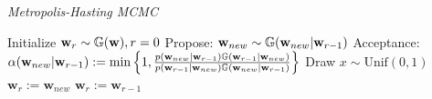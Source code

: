 \begin{algorithm}[!t]
\caption{\it Metropolis-Hasting MCMC}
\label{algo:mcmcmh}
\begin{algorithmic}[1]\vspace{.2cm}
\item Initialize $\mathbf{w}_{r}\sim\mathbb{G}(\mathbf{w}),r=0$\vspace{.2cm}
\vspace{.2cm}
\State Propose: $\mathbf{w}_{new}\sim\mathbb{G}(\mathbf{w}_{new}|\mathbf{w}_{r-1})$\vspace{.2cm}
\State Acceptance: $\alpha(\mathbf{w}_{new}|\mathbf{w}_{r-1}):=\min\left\{1,\frac{ p(\mathbf{w}_{new}|\mathbf{w}_{r-1})\mathbb{G}(\mathbf{w}_{r-1}|\mathbf{w}_{new})}{ p(\mathbf{w}_{r-1}|\mathbf{w}_{new})\mathbb{G}(\mathbf{w}_{new}|\mathbf{w}_{r-1})}\right\}$\vspace{.2cm}
\State Draw $x\sim\text{Unif}(0,1)$\vspace{.2cm}
\vspace{.2cm}
\State $\mathbf{w}_{r}:=\mathbf{w}_{new}$
\vspace{.2cm}
\Else \vspace{.2cm}
\State $\mathbf{w}_{r}:=\mathbf{w}_{r-1}$\vspace{.2cm}
\EndIf\vspace{.2cm}
\EndFor
\end{algorithmic}
\end{algorithm}
\vspace{-.3cm}
